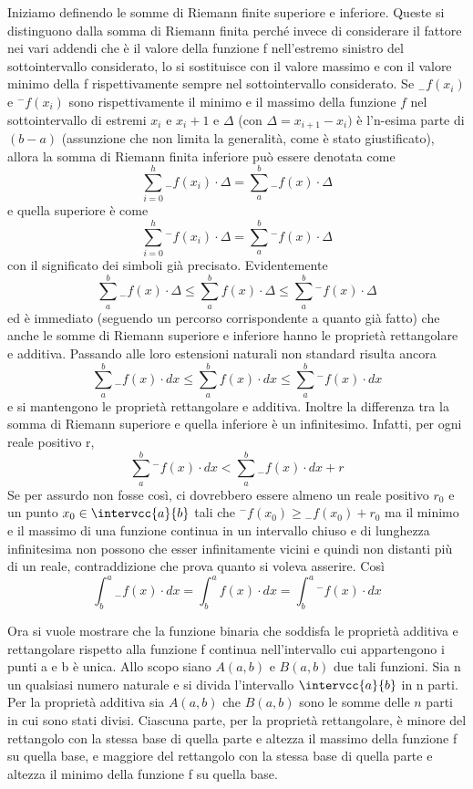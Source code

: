 Iniziamo definendo le somme di Riemann finite superiore e inferiore. Queste 
si distinguono dalla somma di Riemann finita perché invece di considerare il 
fattore nei vari addendi che è il valore della funzione f nell'estremo 
sinistro del sottointervallo considerato, lo si sostituisce con il valore 
massimo e con il valore minimo della f rispettivamente sempre nel 
sottointervallo considerato. Se \({}_{-}f(x_i)\) e \({}^{-}f(x_i)\) sono 
rispettivamente il minimo e il massimo della funzione \(f\) nel 
sottointervallo 
di estremi \(x_i\) e \(x_i+1\) 
e \(\Delta\) (con \(\Delta =x_{i+1} - x_i)\) 
è l'n-esima parte di \((b - a)\) 
(assunzione che non limita la generalità, come è stato giustificato), 
allora la somma di Riemann finita inferiore può essere denotata come 
\[\sum_{i=0}^h{}_{-}f(x_i)\cdot\Delta = \sum_a^b{}_{-} f(x) \cdot \Delta\] 
e quella superiore è come 
\[\sum_{i=0}^h {}^{-}f(x_i)\cdot\Delta = 
  \sum_a^b {}^{-}f(x) \cdot \Delta\] 
con il significato dei simboli già precisato.
Evidentemente 
\[\sum_a^b{}_{-}f(x) \cdot \Delta \le \sum_a^b f(x) \cdot \Delta \le 
\sum_a^b {}^{-}f(x) \cdot \Delta\] 
ed è immediato (seguendo un percorso corrispondente a quanto già fatto) che 
anche le somme di Riemann superiore e inferiore hanno le proprietà rettangolare 
e additiva. 
  Passando alle loro estensioni naturali non standard risulta ancora 
\[\sum_a^b {}_{-}f(x) \cdot dx \le \sum_a^b f(x) \cdot dx \le 
  \sum_a^b {}^{-}f(x) \cdot dx\] 
e si mantengono le proprietà rettangolare e additiva. 
Inoltre la differenza tra la somma di Riemann superiore e quella inferiore è 
un infinitesimo. Infatti, per ogni reale positivo r, 
\[\sum_a^b {}^{-}f(x) \cdot dx < \sum_a^b {}_{-}f(x) \cdot dx +r\] 
Se per assurdo non fosse così, ci dovrebbero essere almeno un reale 
positivo \(r_0\) e un punto \(x_0 \in \intervcc{a}{b}\) tali che 
\({}^{-}f(x_0) \ge {}_{-}f(x_0)+r_0\) 
ma il minimo e il massimo di una funzione continua in un intervallo chiuso e 
di lunghezza infinitesima non possono che esser infinitamente vicini e quindi 
non distanti più di un reale, contraddizione che prova quanto si voleva 
asserire. Così 
\[\int_b^a {}_{-}f(x) \cdot dx = \int_b^a f(x) \cdot dx = 
  \int_b^a {}^{-}f(x) \cdot dx\]
  
Ora si vuole mostrare che la funzione binaria che soddisfa le proprietà 
additiva e rettangolare rispetto alla funzione f continua nell'intervallo 
cui appartengono i punti a e b è unica.
Allo scopo siano \(A(a,b)\) e \(B(a,b)\) due tali funzioni. 
Sia n un qualsiasi numero naturale e si divida l'intervallo 
\(\intervcc{a}{b}\) in n parti. 
Per la proprietà 
additiva sia \(A(a,b)\) che \(B(a,b)\) sono le somme delle \(n\) 
parti in cui sono stati divisi. 
Ciascuna parte, per la proprietà rettangolare, è minore del 
rettangolo con la stessa base di quella parte e altezza il massimo della 
funzione f su quella base, e maggiore del rettangolo con la stessa base di 
quella parte e altezza il minimo della funzione f su quella base. 

